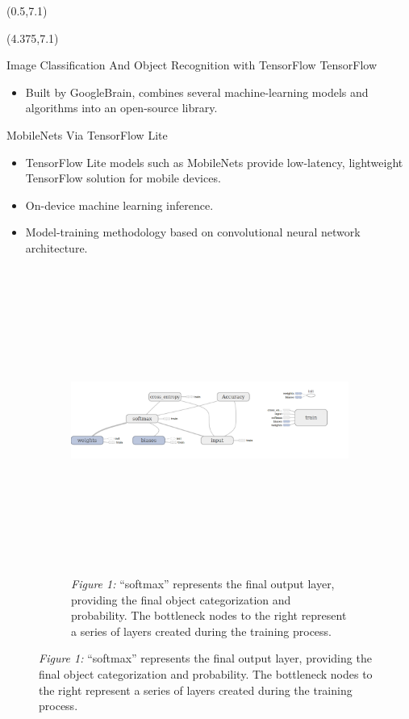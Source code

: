 \documentclass[22pt]{beamer}
\begin{document}
\begin{frame}[fragile]
\begin{textblock}{3.5}
\end{textblock}

\begin{textblock}{7.25}(0.5,7.1)



\end{textblock}



\begin{textblock}{7.25}(4.375,7.1)
\begin{block}{Image Classification And Object Recognition with TensorFlow}
TensorFlow
\begin{itemize}
\item Built by GoogleBrain, combines several machine-learning models and algorithms into an open-source library.
\end{itemize}
MobileNets Via TensorFlow Lite
\begin{itemize}
\item TensorFlow Lite models such as MobileNets provide low-latency, lightweight TensorFlow solution for mobile devices.
\item On-device machine learning inference.
\item Model-training methodology based on convolutional neural network architecture.
\end{itemize}
\begin{figure}[htbp] %
\begin{subfigure}{0.95\textwidth}
   \centering
   \includegraphics[height=10cm]{softmax.png}
   \caption*{\textit{Figure 1:} “softmax” represents the final output layer, providing the final object categorization and probability. The bottleneck nodes to the right represent a series of layers created during the training process.}

\end{subfigure}
\end{figure}
\end{block}
\end{textblock}
\end{frame}
\end{document}
